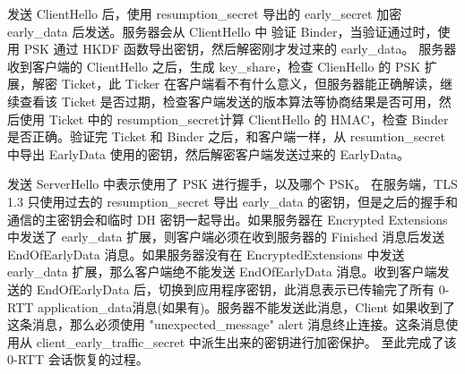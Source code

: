 发送 ClientHello 后，使用 resumption\_secret 导出的 early\_secret 加密 early\_data 后发送。服务器会从 ClientHello 中 验证 Binder，当验证通过时，使用 PSK 通过 HKDF 函数导出密钥，然后解密刚才发过来的 early\_data。
服务器收到客户端的 ClientHello 之后，生成 key\_share，检查 ClienHello 的 PSK 扩展，解密 Ticket，此 Ticker 在客户端看不有什么意义，但服务器能正确解读，继续查看该 Ticket 是否过期，检查客户端发送的版本算法等协商结果是否可用，然后使用 Ticket 中的 resumption\_secret计算 ClientHello 的 HMAC，检查 Binder 是否正确。验证完 Ticket 和 Binder 之后，和客户端一样，从 resumtion\_secret 中导出 EarlyData 使用的密钥，然后解密客户端发送过来的 EarlyData。

发送 ServerHello 中表示使用了 PSK 进行握手，以及哪个 PSK。 在服务端，TLS 1.3 只使用过去的 resumption\_secret 导出 early\_data 的密钥，但是之后的握手和通信的主密钥会和临时 DH 密钥一起导出。如果服务器在 Encrypted Extensions 中发送了 early\_data 扩展，则客户端必须在收到服务器的 Finished 消息后发送 EndOfEarlyData 消息。如果服务器没有在 EncryptedExtensions 中发送 early\_data 扩展，那么客户端绝不能发送 EndOfEarlyData 消息。收到客户端发送的 EndOfEarlyData 后，切换到应用程序密钥，此消息表示已传输完了所有 0-RTT application\_data消息(如果有)。服务器不能发送此消息，Client 如果收到了这条消息，那么必须使用 "unexpected\_message" alert 消息终止连接。这条消息使用从 client\_early\_traffic\_\-secret 中派生出来的密钥进行加密保护。 至此完成了该 0-RTT 会话恢复的过程。